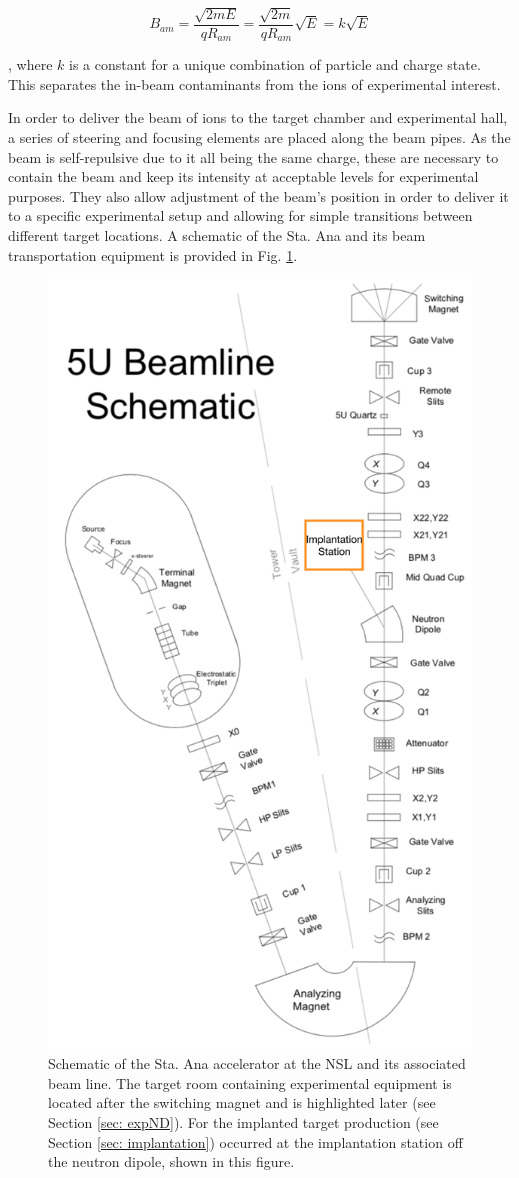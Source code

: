 \begin{equation}
B_{am} = \dfrac{\sqrt{2 m E}}{q R_{am}} = \dfrac{\sqrt{2m}}{q R_{am}} \sqrt{E} = k \sqrt{E}
\label{eqn: analyzingMagnet}
\end{equation}

\noindent, where $k$ is a constant for a unique combination of particle and charge state. This separates the in-beam contaminants from the ions of experimental interest.  

In order to deliver the beam of ions to the target chamber and experimental hall, a series of steering and focusing elements are placed along the beam pipes. As the beam is self-repulsive due to it all being the same charge, these are necessary to contain the beam and keep its intensity at acceptable levels for experimental purposes. They also allow adjustment of the beam's position in order to deliver it to a specific experimental setup and allowing for simple transitions between different target locations. A schematic of the Sta. Ana and its beam transportation equipment is provided in Fig. \ref{fig: staAnaSchematic}. 


\begin{figure}
\centering
\includegraphics[width=0.7\linewidth]{figures/staAnaSchematic.png}
\caption{Schematic of the Sta. Ana accelerator at the NSL and its associated beam line. The target room containing experimental equipment is located after the switching magnet and is highlighted later (see Section \ref{sec: expND}). For the implanted target production (see Section \ref{sec: implantation}) occurred at the implantation station off the neutron dipole, shown in this figure.}
\label{fig: staAnaSchematic}
\end{figure}

